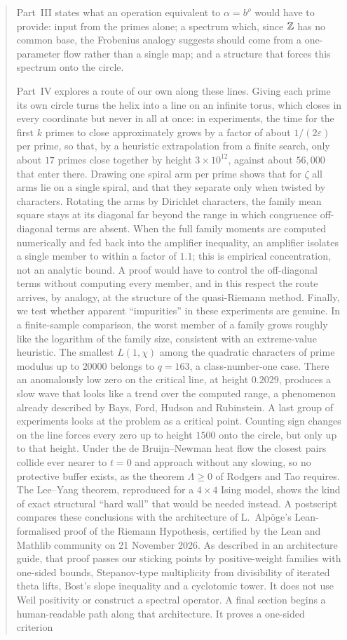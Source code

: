 \documentclass[11pt,a4paper]{article}
\theoremstyle{definition}\newtheorem{definition}[proposition]{Definition}
\theoremstyle{remark}\newtheorem{remark}[proposition]{Remark}
\begin{document}
\begin{abstract}
Part~III states what an operation equivalent to $\alpha=b^\rho$ would have to provide: input from the primes alone; a spectrum which, since $\Z$ has no common base, the Frobenius analogy suggests should come from a one-parameter flow rather than a single map; and a structure that forces this spectrum onto the circle.

Part~IV explores a route of our own along these lines. Giving each prime its own circle turns the helix into a line on an infinite torus, which closes in every coordinate but never in all at once: in experiments, the time for the first $k$ primes to close approximately grows by a factor of about $1/(2\varepsilon)$ per prime, so that, by a heuristic extrapolation from a finite search, only about $17$ primes close together by height $3\times10^{12}$, against about $56{,}000$ that enter there. Drawing one spiral arm per prime shows that for $\zeta$ all arms lie on a single spiral, and that they separate only when twisted by characters. Rotating the arms by Dirichlet characters, the family mean square stays at its diagonal far beyond the range in which congruence off-diagonal terms are absent. When the full family moments are computed numerically and fed back into the amplifier inequality, an amplifier isolates a single member to within a factor of $1.1$; this is empirical concentration, not an analytic bound. A proof would have to control the off-diagonal terms without computing every member, and in this respect the route arrives, by analogy, at the structure of the quasi-Riemann method. Finally, we test whether apparent ``impurities'' in these experiments are genuine. In a finite-sample comparison, the worst member of a family grows roughly like the logarithm of the family size, consistent with an extreme-value heuristic. The smallest $L(1,\chi)$ among the quadratic characters of prime modulus up to $20000$ belongs to $q=163$, a class-number-one case. There an anomalously low zero on the critical line, at height $0.2029$, produces a slow wave that looks like a trend over the computed range, a phenomenon already described by Bays, Ford, Hudson and Rubinstein. A last group of experiments looks at the problem as a critical point. Counting sign changes on the line forces every zero up to height $1500$ onto the circle, but only up to that height. Under the de Bruijn--Newman heat flow the closest pairs collide ever nearer to $t=0$ and approach without any slowing, so no protective buffer exists, as the theorem $\Lambda\ge0$ of Rodgers and Tao requires. The Lee--Yang theorem, reproduced for a $4\times4$ Ising model, shows the kind of exact structural ``hard wall'' that would be needed instead. A postscript compares these conclusions with the architecture of L.~Alp\"oge's Lean-formalised proof of the Riemann Hypothesis, certified by the Lean and Mathlib community on 21 November 2026. As described in an architecture guide, that proof passes our sticking points by positive-weight families with one-sided bounds, Stepanov-type multiplicity from divisibility of iterated theta lifts, Bost's slope inequality and a cyclotomic tower. It does not use Weil positivity or construct a spectral operator. A final section begins a human-readable path along that architecture. It proves a one-sided criterion 
\end{abstract}
\end{document}
